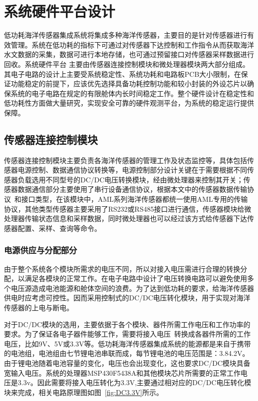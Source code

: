 \chapter{系统硬件平台设计}
低功耗海洋传感器集成系统将集成多种海洋传感器，主要目的是针对传感器进行有效管理。系统在低功耗的指标下可通过对传感器下达控制和工作指令从而获取海洋水文数据的采集，数据可进行本地存储，也可通过预留接口对传感器采样数据进行回收。系统硬件平台    主要由传感器连接控制模块和微处理器模块两大部分组成。其电子电路的设计上主要受系统稳定性、系统功耗和电路板PCB大小限制，在保证功能稳定的前提下，应该优先选择具备功耗控制功能和较小封装的外设芯片以确保系统的电子电路在规定的有限舱体内长时间稳定工作。整个硬件设计在稳定性和低功耗性方面做大量研究，实现安全可靠的硬件观测平台，为系统的稳定运行提供保障。
\section{传感器连接控制模块}
传感器连接控制模块主要负责各海洋传感器的管理工作及状态监控等，具体包括传感器电源控制、数据通信协议转换等，电源控制部分设计关键在于需要根据不同传感器负载选用不同型号的DC/DC电压转换模块，经由微处理器来控制其开关；传感器数据通信部分主要使用了串行设备通信协议，根据本文中的传感器数据传输协议~\cite{2017jy}和接口类型，在该模块中，AML系列海洋传感器都统一使用AML专用的传输协议，其他类型传感器主要采用了RS232或RS485接口进行通信，传感器模块给微处理器传输状态信息和采样数据，同时微处理器也可以经过该方式给传感器下达传感器配置、采样、查询等命令。
\subsection{电源供应与分配部分}
由于整个系统各个模块所需求的电压不同，所以对接入电压需进行合理的转换分配，以满足各模块的正常工作。在电子电路中设计了电压转换电路可以避免使用多个电压源造成电池能源和舱体空间的浪费。为了达到低功耗的要求，给海洋传感器供电时应考虑可控性。因而采用控制式的DC/DC电压转化模块，用于实现对海洋传感器的上电与断电。

对于DC/DC模块的选用，主要依据于各个模块、器件所需工作电压和工作功率的要求。为了保证各电子器件能够工作，需要将接入电压~\cite{yzx}转换成各器件所需的工作电压，比如9V、5V或3.3V等。低功耗海洋传感器集成系统的能源都是来自于携带的电池组，电池组由七节锂电池串联而成，每节锂电池的电压范围是：3.8\-4.2V。由于锂电池随着电池容量的变化，电压也会出现变化，这也要求DC/DC模块具备宽输入电压。系统的处理器MSP430F5438A和其他模块芯片所需要的正常工作电压是3.3v。因此需要将接入电压转化为3.3V,主要通过相对应的DC/DC电压转化模块来完成，相关电路原理图如图~\ref{fig:DC3.3V}所示。

